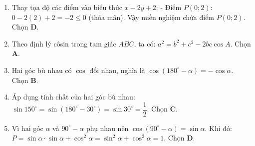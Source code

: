 \documentclass[12pt,a4paper]{article}
\begin{document}
\begin{enumerate}
\item Thay tọa độ các điểm vào biểu thức $x - 2y + 2$:
- Điểm $P(0; 2)$: $0 - 2(2) + 2 = -2 \le 0$ (thỏa mãn).
Vậy miền nghiệm chứa điểm $P(0; 2)$. Chọn \textbf{D}.

\item Theo định lý côsin trong tam giác $ABC$, ta có:
$a^2 = b^2 + c^2 - 2bc \cos A$. Chọn \textbf{A}.

\item Hai góc bù nhau có $\cos$ đối nhau, nghĩa là $\cos(180^\circ - \alpha) = -\cos \alpha$. Chọn \textbf{B}.

\item Áp dụng tính chất của hai góc bù nhau:
$\sin 150^\circ = \sin(180^\circ - 30^\circ) = \sin 30^\circ = \dfrac{1}{2}$. Chọn \textbf{C}.

\item Vì hai góc $\alpha$ và $90^\circ - \alpha$ phụ nhau nên $\cos(90^\circ - \alpha) = \sin \alpha$.
Khi đó: $P = \sin \alpha \cdot \sin \alpha + \cos^2 \alpha = \sin^2 \alpha + \cos^2 \alpha = 1$. Chọn \textbf{D}.
\end{enumerate}
\end{document}
